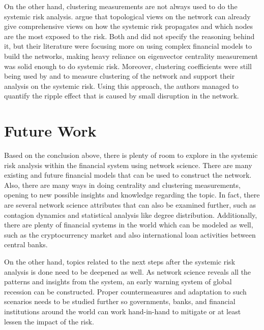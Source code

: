 \documentclass[a4paper,11pt]{article}
\begin{document}
On the other hand, clustering measurements are not always used to do the systemic risk analysis. \cite{Battiston_Puliga_Kaushik_Tasca_Caldarelli_2012}  argue that topological views on the network can already give comprehensive views on how the systemic risk propagates and which nodes are the most exposed to the risk. Both \cite{Duan_El_Ghoul_Guedhami_Li_Li_2020} and \cite{Zhang_Yin_Sha_2023} did not specify the reasoning behind it, but their literature were focusing more on using complex financial models to build the networks, making heavy reliance on eigenvector centrality measurement was solid enough to do systemic risk. Moreover, clustering coefficients were still being used by \cite{Lai_Hu_2021} and \cite{Markose_Giansante_Shaghaghi_2012} to measure clustering of the network and support their analysis on the systemic risk. Using this approach, the authors managed to quantify the ripple effect that is caused by small disruption in the network.

\section{Future Work}
Based on the conclusion above, there is plenty of room to explore in the  systemic risk analysis within the financial system using network science. There are many existing and future financial models that can be used to construct the network. Also, there are many ways in doing centrality and clustering measurements, opening to new possible insights and knowledge regarding the topic. In fact, there are several network science attributes that can also be examined further, such as contagion dynamics and statistical analysis like degree distribution. Additionally, there are plenty of financial systems in the world which can be modeled as well, such as the cryptocurrency market and also international loan activities between central banks.

On the other hand, topics related to the next steps after the systemic risk analysis is done need to be deepened as well. As network science reveals all the patterns and insights from the system, an early warning system of global recession can be constructed. Proper countermeasures and adaptation to such scenarios needs to be studied further so governments, banks, and financial institutions around the world can work hand-in-hand to mitigate or at least lessen the impact of the risk.




\small

\end{document}
